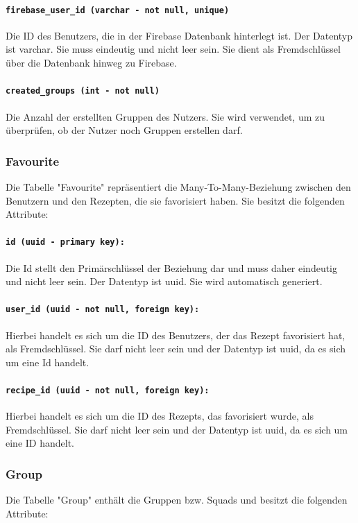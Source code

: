 \documentclass{entwurfsheft}
\begin{document}
\begin{sloppypar}
\paragraph{\texttt{firebase\_user\_id (varchar - not null, unique)}} Die ID des Benutzers, die in der Firebase Datenbank hinterlegt ist. Der Datentyp ist \Gls{varchar}. Sie muss eindeutig und nicht leer sein. Sie dient als Fremdschlüssel über die Datenbank hinweg zu Firebase.
\paragraph{\texttt{created\_groups (int - not null)}}
Die Anzahl der erstellten Gruppen des Nutzers. Sie wird verwendet, um zu überprüfen, ob der Nutzer noch Gruppen erstellen darf.
\newpage
\subsubsection{Favourite}
Die Tabelle "Favourite" repräsentiert die Many-To-Many-Beziehung zwischen den Benutzern und den Rezepten, die sie favorisiert haben. Sie besitzt die folgenden Attribute:
\paragraph{\texttt{id (uuid - primary key):}} Die Id stellt den Primärschlüssel der Beziehung dar und muss daher eindeutig und nicht leer sein. Der Datentyp ist \Gls{uuid}. Sie wird automatisch generiert.
\paragraph{\texttt{user\_id (uuid - not null, foreign key):}} Hierbei handelt es sich um die ID des Benutzers, der das Rezept favorisiert hat, als Fremdschlüssel. Sie darf nicht leer sein und der Datentyp ist \Gls{uuid}, da es sich um eine Id handelt.
\paragraph{\texttt{recipe\_id (uuid - not null, foreign key):}} Hierbei handelt es sich um die ID des Rezepts, das favorisiert wurde, als Fremdschlüssel. Sie darf nicht leer sein und der Datentyp ist \Gls{uuid}, da es sich um eine ID handelt.
\newpage
\subsubsection{Group}
Die Tabelle "Group" enthält die Gruppen bzw. Squads und besitzt die folgenden Attribute:

\end{sloppypar}
\end{document}
